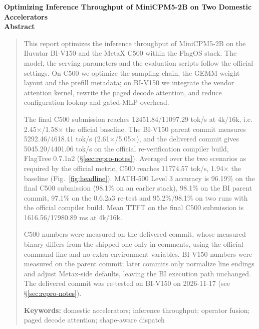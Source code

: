 \documentclass[11pt,a4paper]{ctexart}
\newcommand{\secref}[1]{\S\ref{#1}}
\begin{document}
\clearpage
{}
{}
\begin{center}
{\LARGE\bfseries Optimizing Inference Throughput of MiniCPM5-2B on Two Domestic Accelerators}\\[0.8em]
{\large\bfseries Abstract}
\end{center}
\vspace{0.4em}
\begin{quotation}
\small
\raggedright
\setlength{\parindent}{2em}

This report optimizes the inference throughput of MiniCPM5-2B on the Iluvatar BI-V150 and the MetaX C500 within the FlagOS stack. The model, the serving parameters and the evaluation scripts follow the official settings. On C500 we optimize the sampling chain, the GEMM weight layout and the prefill metadata; on BI-V150 we integrate the vendor attention kernel, rewrite the paged decode attention, and reduce configuration lookup and gated-MLP overhead.

The final C500 submission reaches 12451.84/11097.29 tok/s at 4k/16k, i.e. 2.45$\times$/1.58$\times$ the official baseline. The BI-V150 parent commit measures 5292.46/4618.41 tok/s (2.61$\times$/5.05$\times$), and the delivered commit gives 5045.20/4401.06 tok/s on the official re-verification compiler build, FlagTree 0.7.1a2 (\secref{sec:repro-notes}). Averaged over the two scenarios as required by the official metric, C500 reaches 11774.57 tok/s, 1.94$\times$ the baseline (Fig.~\ref{fig:headline}). MATH-500 Level 3 accuracy is 96.19\% on the final C500 submission (98.1\% on an earlier stack), 98.1\% on the BI parent commit, 97.1\% on the 0.6.2a3 re-test and 95.2\%/98.1\% on two runs with the official compiler build. Mean TTFT on the final C500 submission is 1616.56/17980.89 ms at 4k/16k.

C500 numbers were measured on the delivered commit, whose measured binary differs from the shipped one only in comments, using the official command line and no extra environment variables. BI-V150 numbers were measured on the parent commit; later commits only normalize line endings and adjust Metax-side defaults, leaving the BI execution path unchanged. The delivered commit was re-tested on BI-V150 on 2026-11-17 (see \secref{sec:repro-notes}).

\par\smallskip
\noindent\textbf{Keywords:} domestic accelerators; inference throughput; operator fusion; paged decode attention; shape-aware dispatch
\par
\end{quotation}
\end{document}
